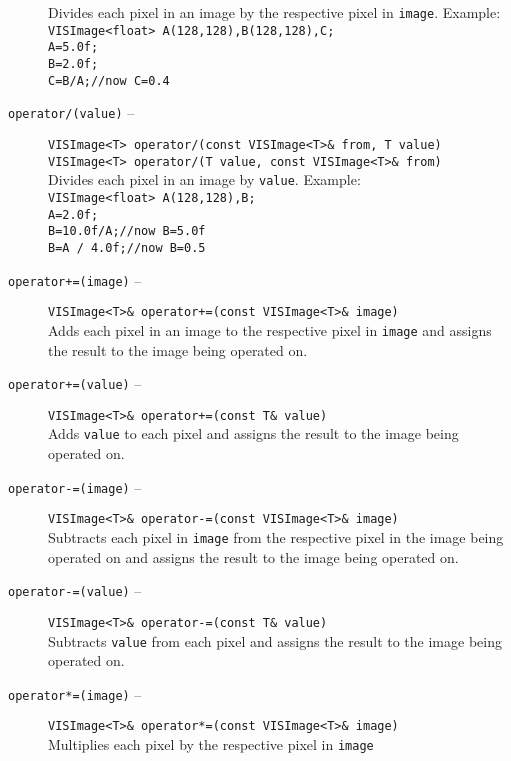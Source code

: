\begin{description}
Divides each pixel in an image by the respective pixel in
{\tt image}.  Example:\\
{\tt VISImage<float> A(128,128),B(128,128),C;}\\
{\tt A=5.0f;}\\
{\tt B=2.0f;}\\
{\tt C=B/A;//now C=0.4}
\item[{\tt operator/(value)} --]
{\tt VISImage<T> operator/(const VISImage<T>\& from, T value)}\\
{\tt VISImage<T> operator/(T value, const VISImage<T>\& from)}\\
Divides each pixel in an image by {\tt value}.
Example:\\
{\tt VISImage<float> A(128,128),B;}\\
{\tt A=2.0f;}\\
{\tt B=10.0f/A;//now B=5.0f}\\
{\tt B=A / 4.0f;//now B=0.5}
\item[{\tt operator+=(image)} --]
{\tt VISImage<T>\& operator+=(const VISImage<T>\& image)}\\
Adds each pixel in an image to the respective pixel in {\tt image}
and assigns the result to the image being operated on.
\item[{\tt operator+=(value)} --]
{\tt VISImage<T>\& operator+=(const T\& value)}\\
Adds {\tt value} to each pixel and assigns the result to the image being
operated on.
\item[{\tt operator-=(image)} --]
{\tt VISImage<T>\& operator-=(const VISImage<T>\& image)}\\
Subtracts each pixel in {\tt image} from the respective pixel in the
image being operated on and assigns the result to the image being operated on.
\item[{\tt operator-=(value)} --]
{\tt VISImage<T>\& operator-=(const T\& value)}\\
Subtracts {\tt value} from each pixel and assigns the result to the image being
operated on.
\item[{\tt operator*=(image)} --]
{\tt VISImage<T>\& operator*=(const VISImage<T>\& image)}\\
Multiplies each pixel by the respective pixel in {\tt image}

\end{description}
